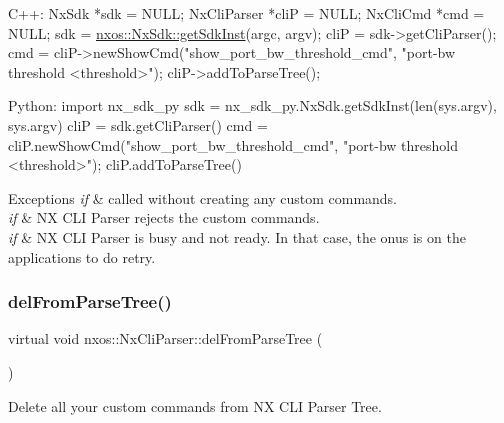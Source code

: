 \begin{DoxyCode}
C++:
     NxSdk       *sdk  = NULL;
     NxCliParser *cliP = NULL;
     NxCliCmd    *cmd  = NULL;
     sdk = \mbox{\hyperlink{classnxos_1_1_nx_sdk_a5050e2d26c40744b4fc7862068a83f39}{nxos::NxSdk::getSdkInst}}(argc, argv);
     cliP = sdk->getCliParser();
     cmd = cliP->newShowCmd(\textcolor{stringliteral}{"show\_port\_bw\_threshold\_cmd"},
                            \textcolor{stringliteral}{"port-bw threshold <threshold>"});
     cliP->addToParseTree();                       

Python:
     \textcolor{keyword}{import} nx\_sdk\_py
     sdk = nx\_sdk\_py.NxSdk.getSdkInst(len(sys.argv), sys.argv)
     cliP = sdk.getCliParser()
     cmd = cliP.newShowCmd(\textcolor{stringliteral}{"show\_port\_bw\_threshold\_cmd"},
                           \textcolor{stringliteral}{"port-bw threshold <threshold>"});
     cliP.addToParseTree()
\end{DoxyCode}



\begin{DoxyExceptions}{Exceptions}
{\em if} & called without creating any custom commands. \\
\hline
{\em if} & NX C\+LI Parser rejects the custom commands. \\
\hline
{\em if} & NX C\+LI Parser is busy and not ready. In that case, the onus is on the applications to do retry. \\
\hline
\end{DoxyExceptions}
\mbox{\label{classnxos_1_1_nx_cli_parser_a169976099ecf7a05277bfc72259ff1bc}} 
\subsubsection{\texorpdfstring{del\+From\+Parse\+Tree()}{delFromParseTree()}}
{\footnotesize\ttfamily virtual void nxos\+::\+Nx\+Cli\+Parser\+::del\+From\+Parse\+Tree (\begin{DoxyParamCaption}{ }\end{DoxyParamCaption})\hspace{0.3cm}{\ttfamily [pure virtual]}}

Delete all your custom commands from NX C\+LI Parser Tree.


